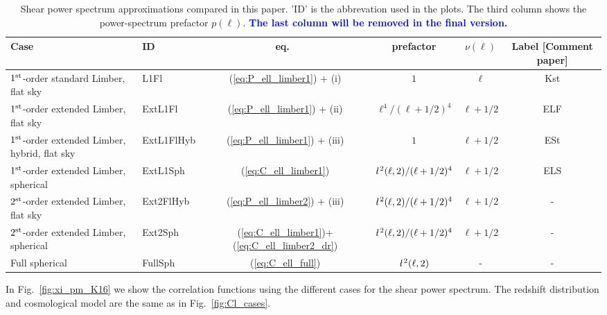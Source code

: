 \documentclass[fleqn,usenatbib]{mnras} %
\newcommand{\ellbar}{\hbox{\it \l}\,}
\newcommand{\mk}[1]{{\bf\textcolor{blue}{#1}}}
\begin{document}
\renewcommand{\baselinestretch}{1.3}
\begin{table}[ht!]

  \label{tab:cases}

  \caption{Shear power spectrum approximations compared in this paper. 'ID' is the abbrevation used in the plots.
    The third column shows the power-spectrum prefactor $p(\ell)$.  \mk{The last column will be removed in the
        final version.}}

  \begin{tabular}{|l|l|c|c|c|c}
  \hline
  Case & ID & eq.~ & prefactor & $\nu(\ell)$ & Label [Comment paper] \\ \hline
  $1^{\rm st}$-order standard Limber, flat sky & L1Fl & (\ref{eq:P_ell_limber1}) + (i)
    & $1$ & $\ell$ & Kst \\ \hline
  $1^{\rm st}$-order extended Limber, flat sky & ExtL1Fl & (\ref{eq:P_ell_limber1}) + (ii)
    & $\ell^4/(\ell+1/2)^4$ & $\ell + 1/2$ & ELF \\ \hline
  $1^{\rm st}$-order extended Limber, hybrid, flat sky & ExtL1FlHyb & (\ref{eq:P_ell_limber1}) + (iii)
    & $1$ & $\ell + 1/2$ & ESt \\ \hline
  $1^{\rm st}$-order extended Limber, spherical & ExtL1Sph & (\ref{eq:C_ell_limber1})
    & $\ellbar^2(\ell, 2)/(\ell+1/2)^4$ & $\ell+1/2$ & ELS \\ \hline
  $2^{\rm st}$-order extended Limber, flat sky & Ext2FlHyb & (\ref{eq:P_ell_limber2}) + (iii)
    & $\ellbar^2(\ell, 2)/(\ell+1/2)^4$ & $\ell+1/2$ & - \\ \hline
  $2^{\rm st}$-order extended Limber, spherical & Ext2Sph & (\ref{eq:C_ell_limber1})+(\ref{eq:C_ell_limber2_dr})
    & $\ellbar^2(\ell, 2)/(\ell+1/2)^4$ & $\ell+1/2$ & - \\ \hline
  Full spherical & FullSph & (\ref{eq:C_ell_full}) &
      $\ellbar^2(\ell, 2)$ & - & - \\ \hline
  \end{tabular}

\end{table}
\renewcommand{\baselinestretch}{1}

In Fig.~\ref{fig:xi_pm_K16} we show the correlation functions using the different cases
for the shear power spectrum. The redshift distribution and cosmological model are the same 
as in Fig.~\ref{fig:Cl_cases}.
\end{document}

